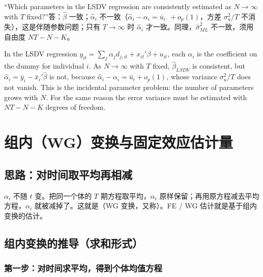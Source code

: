 \begin{keypt}
“Which parameters in the LSDV regression are consistently estimated as $N\to\infty$ with $T$ fixed?”答：$\hat\beta$ 一致；$\hat\alpha_i$ 不一致（$\hat\alpha_i-\alpha_i=\bar u_{i\cdot}+o_p(1)$，方差 $\sigma_u^2/T$ 不消失），这是伴随参数问题；只有 $T\to\infty$ 时 $\hat\alpha_i$ 才一致。同理，$\hat\sigma^2_{ML}$ 不一致，须用自由度 $NT-N-K$。
\end{keypt}

\begin{english}
In the LSDV regression $y_{it}=\sum_j\alpha_jd_{j,it}+x_{it}'\beta+u_{it}$, each $\alpha_i$ is the coefficient on the dummy for individual $i$. As $N\to\infty$ with $T$ fixed, $\hat\beta_{LSDV}$ is consistent, but $\hat\alpha_i=\bar y_i-\bar x_i'\hat\beta$ is not, because $\hat\alpha_i-\alpha_i=\bar u_i+o_p(1)$, whose variance $\sigma_u^2/T$ does not vanish. This is the incidental parameter problem: the number of parameters grows with $N$. For the same reason the error variance must be estimated with $NT-N-K$ degrees of freedom.
\end{english}

\section{组内（WG）变换与固定效应估计量}\label{sec:U10a-wg}

\subsection{思路：对时间取平均再相减}

$\alpha_i$ 不随 $t$ 变。把同一个体的 $T$ 期方程取平均，$\alpha_i$ 原样保留；再用原方程减去平均方程，$\alpha_i$ 就被减掉了。这就是（WG 变换，又称）。FE / WG 估计就是基于组内变换的估计。

\subsection{组内变换的推导（求和形式）}

\subsubsection{第一步：对时间求平均，得到个体均值方程}

